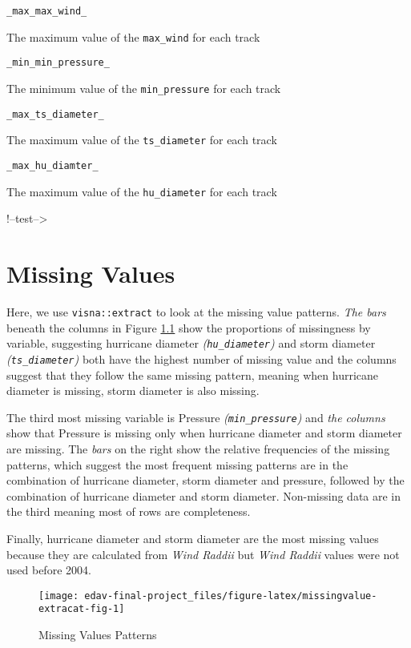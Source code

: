 \documentclass[]{book}
\begin{document}
\texttt{\_max\_max\_wind\_}

The maximum value of the \texttt{max\_wind} for each track

\texttt{\_min\_min\_pressure\_}

The minimum value of the \texttt{min\_pressure} for each track

\texttt{\_max\_ts\_diameter\_}

The maximum value of the \texttt{ts\_diameter} for each track

\texttt{\_max\_hu\_diamter\_}

The maximum value of the \texttt{hu\_diameter} for each track

!--test--\textgreater{}

\hypertarget{missingval}{%
\chapter{Missing Values}\label{missingval}}

Here, we use \texttt{visna::extract} to look at the missing value patterns. \emph{The bars} beneath the columns in Figure \ref{fig:missingvalue-extracat-fig} show the proportions of missingness by variable, suggesting hurricane diameter \emph{(\texttt{hu\_diameter})} and storm diameter \emph{(\texttt{ts\_diameter})} both have the highest number of missing value and the columns suggest that they follow the same missing pattern, meaning when hurricane diameter is missing, storm diameter is also missing.

The third most missing variable is Pressure \emph{(\texttt{min\_pressure})} and \emph{the columns} show that Pressure is missing only when hurricane diameter and storm diameter are missing. The \emph{bars} on the right show the relative frequencies of the missing patterns, which suggest the most frequent missing patterns are in the combination of hurricane diameter, storm diameter and pressure, followed by the combination of hurricane diameter and storm diameter. Non-missing data are in the third meaning most of rows are completeness.

Finally, hurricane diameter and storm diameter are the most missing values because they are calculated from \emph{Wind Raddii} but \emph{Wind Raddii} values were not used before 2004.

\begin{figure}

{\centering \texttt{[image: edav-final-project\_files/figure-latex/missingvalue-extracat-fig-1]} 

}

\caption{Missing Values Patterns}\label{fig:missingvalue-extracat-fig}
\end{figure}
\end{document}

